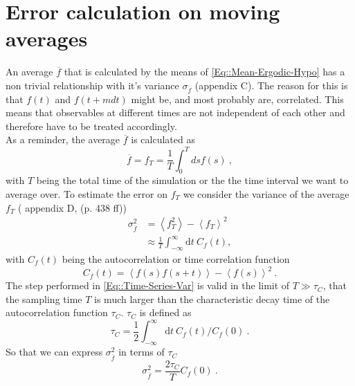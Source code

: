 	\section{Error calculation on moving averages} \label{Section::Error-Calc}	
	An average $\overline{f}$ that is calculated by the means of \autoref{Eq::Mean-Ergodic-Hypo} has a non trivial relationship with it's variance $\sigma_{\overline{f}}$ \cite{madras1988pivot} (appendix C). The reason for this is that $f(t)$ and $f(t + mdt)$ might be, and most probably are, correlated. This means that observables at different times are not independent of each other and therefore have to be treated accordingly. \\
	
	As a reminder, the average $\overline{f}$ is calculated as
	\begin{equation}
		\overline{f} = f_T =	\frac{1}{T} \int_0^{T} ds f(s) ~,
	\end{equation}
	with $T$ being the total time of the simulation or the the time interval we want to average over. To estimate the error on $f_T$ we consider the variance of the average $f_T$ (\cite{frenkel2023understanding} appendix D, \cite{anderson2011statistical} (p. 438 ff))
	\begin{equation} \label{Eq::Time-Series-Var}
		\begin{split}
			\sigma_{\overline{f}}^2 &=	\left \langle f_T^2 \right \rangle - \left \langle f_T \right \rangle^2 \\
			&\approx \frac{1}{T} \int_{-\infty}^{\infty} \text{d}t~C_f(t),
		\end{split}
	\end{equation}
	with $C_f(t)$ being the autocorrelation or time correlation function
	\begin{equation} \label{Eq::Autorcorrlation-Time}
		C_f(t) =	\left \langle f(s) f(s + t) \right \rangle - \left \langle f(s) \right \rangle^2~.
	\end{equation}
	The step performed in \autoref{Eq::Time-Series-Var} is valid in the limit of $T \gg \tau_C$, that the sampling time $T$ is much larger than the characteristic decay time of the autocorrelation function $\tau_C$. $\tau_C$ is defined as
	\begin{equation}
		\tau_C = \frac{1}{2}	\int_{-\infty}^{\infty} \text{d}t~C_f(t) /	C_f(0)~.
	\end{equation}
	So that we can express $\sigma_{\overline{f}}^2$ in terms of $\tau_C$
	\begin{equation}
		\sigma_{\overline{f}}^2 =	\frac{2\tau_C}{T} C_f(0)~.
	\end{equation}
